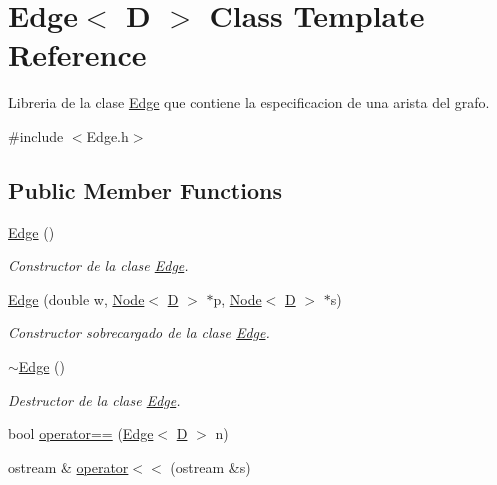 \hypertarget{class_edge}{\section{Edge$<$ D $>$ Class Template Reference}
\label{class_edge}
}


Libreria de la clase \hyperlink{class_edge}{Edge} que contiene la especificacion de una arista del grafo.  




{\ttfamily \#include $<$Edge.\+h$>$}

\subsection*{Public Member Functions}
\begin{DoxyCompactItemize}
\item 
\hyperlink{class_edge_ad81f88d2a5cc93695d754baeb0918f75}{Edge} ()
\begin{DoxyCompactList}\small\item\em Constructor de la clase \hyperlink{class_edge}{Edge}. \end{DoxyCompactList}\item 
\hyperlink{class_edge_a74e3d784d79402239b2a0f868885b0bb}{Edge} (double w, \hyperlink{class_node}{Node}$<$ \hyperlink{gwp_2main_8cpp_af316c33cc298530f245e8b55330e86b5}{D} $>$ $\ast$p, \hyperlink{class_node}{Node}$<$ \hyperlink{gwp_2main_8cpp_af316c33cc298530f245e8b55330e86b5}{D} $>$ $\ast$s)
\begin{DoxyCompactList}\small\item\em Constructor sobrecargado de la clase \hyperlink{class_edge}{Edge}. \end{DoxyCompactList}\item 
\hyperlink{class_edge_a58d492062e39a6fbe483e13560781aef}{$\sim$\+Edge} ()
\begin{DoxyCompactList}\small\item\em Destructor de la clase \hyperlink{class_edge}{Edge}. \end{DoxyCompactList}\item 
bool \hyperlink{class_edge_a00131853f3e1efb48a0acc841a5e41c5}{operator==} (\hyperlink{class_edge}{Edge}$<$ \hyperlink{gwp_2main_8cpp_af316c33cc298530f245e8b55330e86b5}{D} $>$ n)
\item 
ostream \& \hyperlink{class_edge_a4b5e4d1ab369f9924104da252d2838ad}{operator$<$$<$} (ostream \&s)
\end{DoxyCompactItemize}
